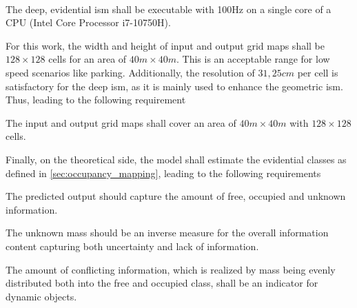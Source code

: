 \\
\begin{subreq} \label{subreq:resource_efficient_inference}
	The deep, evidential \gls{ism} shall be executable with 100Hz on a single core of a CPU (Intel Core Processor i7-10750H).
\end{subreq}
For this work, the width and height of input and output grid maps shall be $128\times 128$ cells for an area of $40m \times 40m$. This is an acceptable range for low speed scenarios like parking. Additionally, the resolution of $31,25 cm$ per cell is satisfactory for the deep \gls{ism}, as it is mainly used to enhance the geometric \gls{ism}. Thus, leading to the following requirement\\
\begin{subreq} \label{subreq:grid_map_size}
	The input and output grid maps shall cover an area of $40m \times 40m$ with $128 \times 128$ cells.
\end{subreq}
Finally, on the theoretical side, the model shall estimate the evidential classes as defined in \ref{sec:occupancy_mapping}, leading to the following requirements
\\
\begin{subreq} \label{subreq:ev_rep}
	The predicted output should capture the amount of free, occupied and unknown information.
\end{subreq}
\begin{subreq} \label{subreq:unknown_mass}
	The unknown mass should be an inverse measure for the overall information content capturing both uncertainty and lack of information.
\end{subreq}
\begin{subreq} \label{subreq:conflicting_mass}
	The amount of conflicting information, which is realized by mass being evenly distributed both into the free and occupied class, shall be an indicator for dynamic objects.
\end{subreq}

%
